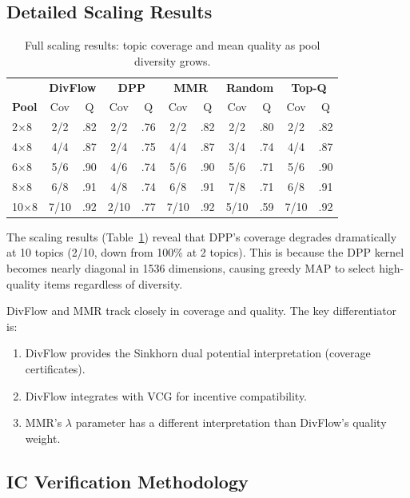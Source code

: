 \documentclass[10pt]{article}
\begin{document}
\subsection{Detailed Scaling Results}

\begin{table}[H]
\centering
\caption{Full scaling results: topic coverage and mean quality as pool diversity grows.}
\label{tab:scaling-full}
\small
\begin{tabular}{l|cc|cc|cc|cc|cc}
\toprule
& \multicolumn{2}{c|}{\textbf{DivFlow}} & \multicolumn{2}{c|}{\textbf{DPP}} & \multicolumn{2}{c|}{\textbf{MMR}} & \multicolumn{2}{c|}{\textbf{Random}} & \multicolumn{2}{c}{\textbf{Top-Q}} \\
\textbf{Pool} & Cov & Q & Cov & Q & Cov & Q & Cov & Q & Cov & Q \\
\midrule
2$\times$8 & 2/2 & .82 & 2/2 & .76 & 2/2 & .82 & 2/2 & .80 & 2/2 & .82 \\
4$\times$8 & 4/4 & .87 & 2/4 & .75 & 4/4 & .87 & 3/4 & .74 & 4/4 & .87 \\
6$\times$8 & 5/6 & .90 & 4/6 & .74 & 5/6 & .90 & 5/6 & .71 & 5/6 & .90 \\
8$\times$8 & 6/8 & .91 & 4/8 & .74 & 6/8 & .91 & 7/8 & .71 & 6/8 & .91 \\
10$\times$8 & 7/10 & .92 & 2/10 & .77 & 7/10 & .92 & 5/10 & .59 & 7/10 & .92 \\
\bottomrule
\end{tabular}
\end{table}

The scaling results (Table~\ref{tab:scaling-full}) reveal that DPP's coverage degrades dramatically at 10 topics (2/10, down from 100\% at 2 topics). This is because the DPP kernel becomes nearly diagonal in 1536 dimensions, causing greedy MAP to select high-quality items regardless of diversity.

DivFlow and MMR track closely in coverage and quality. The key differentiator is:
\begin{enumerate}
\item DivFlow provides the Sinkhorn dual potential interpretation (coverage certificates).
\item DivFlow integrates with VCG for incentive compatibility.
\item MMR's $\lambda$ parameter has a different interpretation than DivFlow's quality weight.
\end{enumerate}

\subsection{IC Verification Methodology}
\end{document}
